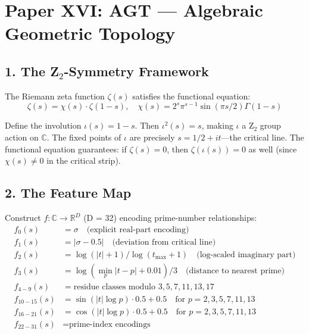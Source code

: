 \documentclass[11pt]{article}
\begin{document}
\newpage
\section*{Paper XVI: AGT --- Algebraic Geometric Topology}

\subsection*{1. The Z$_2$-Symmetry Framework}

The Riemann zeta function $\zeta(s)$ satisfies the functional equation:
$$\zeta(s) = \chi(s) \cdot \zeta(1-s), \quad \chi(s) = 2^s \pi^{s-1} \sin(\pi s/2) \Gamma(1-s)$$

Define the involution $\iota(s) = 1 - s$. Then $\iota^2(s) = s$, making $\iota$ a Z$_2$ group action on $\mathbb{C}$. The fixed points of $\iota$ are precisely $s = 1/2 + it$---the critical line. The functional equation guarantees: if $\zeta(s) = 0$, then $\zeta(\iota(s)) = 0$ as well (since $\chi(s) \neq 0$ in the critical strip).

\subsection*{2. The Feature Map}

Construct $f: \mathbb{C} \to \mathbb{R}^D$ (D = 32) encoding prime-number relationships:
\begin{align*}
f_0(s) &= \sigma \quad \text{(explicit real-part encoding)} \\
f_1(s) &= |\sigma - 0.5| \quad \text{(deviation from critical line)} \\
f_2(s) &= \log(|t|+1) / \log(t_{\max}+1) \quad \text{(log-scaled imaginary part)} \\
f_3(s) &= \log(\min_p |t-p| + 0.01) / 3 \quad \text{(distance to nearest prime)} \\
f_{4-9}(s) &= \text{residue classes modulo } 3,5,7,11,13,17 \\
f_{10-15}(s) &= \sin(|t| \log p) \cdot 0.5 + 0.5 \quad \text{for } p = 2,3,5,7,11,13 \\
f_{16-21}(s) &= \cos(|t| \log p) \cdot 0.5 + 0.5 \quad \text{for } p = 2,3,5,7,11,13 \\
f_{22-31}(s) &= \text{prime-index encodings}
\end{align*}
\end{document}

